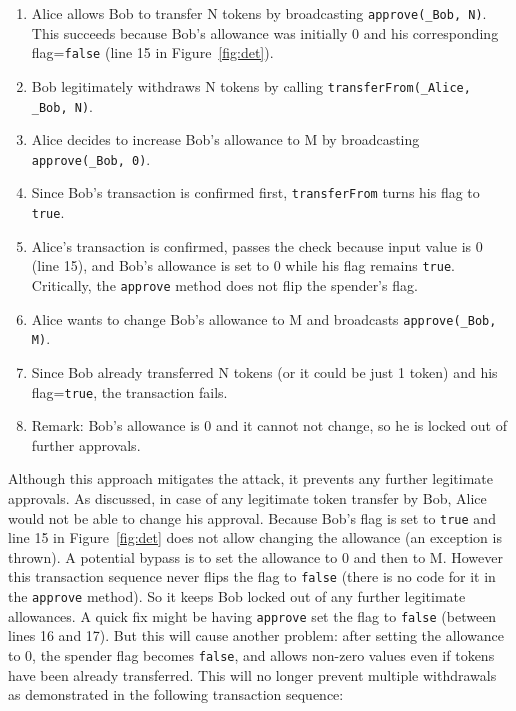 \begin{enumerate}
	\item Alice allows Bob to transfer N tokens by broadcasting \texttt{approve(\_Bob, N)}. This succeeds because Bob’s allowance was initially 0 and his corresponding flag=\texttt{false} (line 15 in Figure~\ref{fig:det}).
	\item Bob legitimately withdraws N tokens by calling \texttt{transferFrom(\_Alice, \_Bob, N)}.
	\item Alice decides to increase Bob's allowance to M by broadcasting \texttt{approve(\_Bob, 0)}.
	\item Since Bob's transaction is confirmed first, \texttt{transferFrom} turns his flag to \texttt{true}.
	\item Alice’s transaction is confirmed, passes the check because input value is 0 (line 15), and Bob’s allowance is set to 0 while his flag remains \texttt{true}. Critically, the \texttt{approve} method does not flip the spender's flag.
	\item Alice wants to change Bob’s allowance to M and broadcasts \texttt{approve(\_Bob, M)}. 
	\item Since Bob already transferred N tokens (or it could be just 1 token) and his flag=\texttt{true}, the transaction fails.
	\item Remark: Bob’s allowance is 0 and it cannot not change, so he is locked out of further approvals.
\end{enumerate}

Although this approach mitigates the attack, it prevents any further legitimate approvals. As discussed, in case of any legitimate token transfer by Bob, Alice would not be able to change his approval. Because Bob's flag is set to \texttt{true} and line 15 in Figure~\ref{fig:det} does not allow changing the allowance (an exception is thrown). A potential bypass is to set the allowance to 0 and then to M. However this transaction sequence never flips the flag to \texttt{false} (there is no code for it in the \texttt{approve} method). So it keeps Bob locked out of any further legitimate allowances. A quick fix might be having \texttt{approve} set the flag to \texttt{false} (\ie between lines 16 and 17). But this will cause another problem: after setting the allowance to 0, the spender flag becomes \texttt{false}, and allows non-zero values even if tokens have been already transferred. This will no longer prevent multiple withdrawals as demonstrated in the following transaction sequence:


